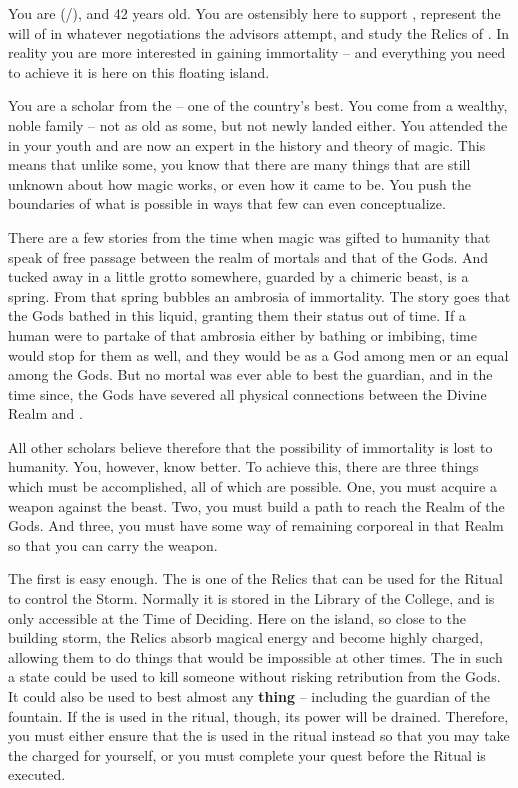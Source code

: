\documentclass[char]{GL2020}
\begin{document}
\name{\cWildCard{}}

You are \cWildCard{\full} (\cWildCard{\they}/\cWildCard{\them}), and 42 years old. You are ostensibly here to support \cEvil{\full}, represent the will of \cQueen{\Majesty} \cQueen{} in whatever negotiations the advisors attempt, and study the Relics of \pEarth{}. In reality you are more interested in gaining immortality -- and everything you need to achieve it is here on this floating island.

You are a scholar from the \pFarm{} -- one of the country’s best. You come from a wealthy, noble family -- not as old as some, but not newly landed either. You attended the \pSchool{} in your youth and are now an expert in the history and theory of magic. This means that unlike some, you know that there are many things that are still unknown about how magic works, or even how it came to be. You push the boundaries of what is possible in ways that few can even conceptualize.

There are a few stories from the time when magic was gifted to humanity that speak of free passage between the realm of mortals and that of the Gods. And tucked away in a little grotto somewhere, guarded by a chimeric beast, is a spring. From that spring bubbles an ambrosia of immortality. The story goes that the Gods bathed in this liquid, granting them their status out of time. If a human were to partake of that ambrosia either by bathing or imbibing, time would stop for them as well, and they would be as a God among men or an equal among the Gods. But no mortal was ever able to best the guardian, and in the time since, the Gods have severed all physical connections between the Divine Realm and \pEarth{}.

All other scholars believe therefore that the possibility of immortality is lost to humanity. You, however, know better. To achieve this, there are three things which must be accomplished, all of which are possible. One, you must acquire a weapon against the beast. Two, you must build a path to reach the Realm of the Gods.  And three, you must have some way of remaining corporeal in that Realm so that you can carry the weapon.

The first is easy enough. The \iScythe{} is one of the \pFarm{} Relics that can be used for the Ritual to control the Storm. Normally it is stored in the Library of the College, and is only accessible at the Time of Deciding. Here on the island, so close to the building storm, the Relics absorb magical energy and become highly charged, allowing them to do things that would be impossible at other times. The \iScythe{} in such a state could be used to kill someone without risking retribution from the Gods. It could also be used to best almost any \textbf{thing} -- including the guardian of the fountain. If the \iScythe{} is used in the ritual, though, its power will be drained. Therefore, you must either ensure that the \iPitcher{} is used in the ritual instead so that you may take the charged \iScythe{} for yourself, or you must complete your quest before the Ritual is executed.
\end{document}
